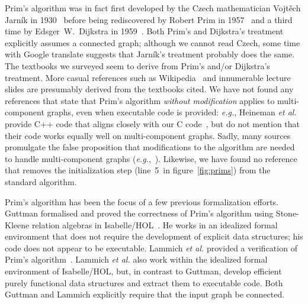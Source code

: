 Prim's algorithm was in fact first developed by the Czech mathematician Vojt\v{e}ch Jarn\'{i}k in 1930~\cite{prim1:jarnik} before being rediscovered by Robert Prim in 1957~\cite{prim2:prim} and a third time by Edsger~W.~Dijkstra in 1959~\cite{DBLP:journals/nm/Dijkstra59}.  Both Prim's and Dijkstra's treatment explicitly assumes a connected graph; although we cannot read Czech, some time with Google translate suggests that Jarn\'{i}k's treatment probably does the same.  The textbooks we surveyed \cite{kepnergilbert,sedgewick,DBLP:books/daglib/0029345,rozen,DBLP:books/daglib/0022194,clrs,DBLP:books/daglib/0015106} seem to derive from Prim's and/or Dijkstra's treatment.
More casual references such as Wikipedia~\cite{prim:wiki} and innumerable lecture slides are presumably derived from the textbooks cited.  We have not found any references that state that Prim's algorithm \emph{without modification} applies to multi-component graphs, even when executable code is provided: \emph{e.g.}, Heineman \emph{et al.} provide C++ code that aligns closely with our C code~\cite{heineman2008algorithms}, but do not mention that their code works equally well on multi-component graphs.  Sadly, many sources promulgate the false proposition that modifications to the algorithm are needed to handle multi-component graphs (\emph{e.g.},~\cite{kepnergilbert,sedgewick,DBLP:books/daglib/0029345,rozen,prim:wiki}).  Likewise, we have found no reference that removes the initialization step (line~5~in figure~\ref{fig:prims}) from the standard algorithm.

Prim's algorithm has been the focus of a few previous formalization efforts.  Guttman formalised and proved the correctness of Prim's algorithm using Stone-Kleene relation algebras in Isabelle/HOL~\cite{DBLP:conf/ictac/Guttmann16}.  He works in an idealized formal environment that does not require the development of explicit data structures; his code does not appear to be executable.  Lammich \emph{et al.} provided a verification of Prim's algorithm~\cite{DBLP:journals/afp/LammichN19}.  Lammich \emph{et al.} also work within the idealized formal environment of Isabelle/HOL, but, in contrast to Guttman, develop efficient purely functional data structures and extract them to executable code.  Both Guttman and Lammich explicitly require that the input graph be connected. %





